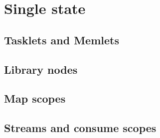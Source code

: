 \section{Single state}

\subsection{Tasklets and Memlets}


\subsection{Library nodes}

\subsection{Map scopes}

\subsection{Streams and consume scopes}